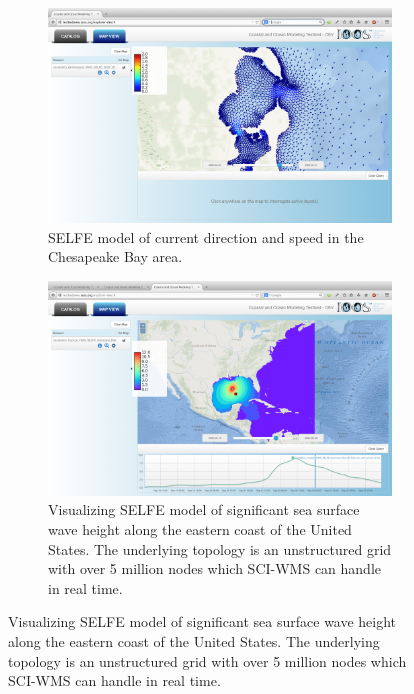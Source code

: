 \begin{figure}[ht!]
  \begin{subfigure}[t]{0.45\textwidth}
    \centering
    \includegraphics[width=\columnwidth]{../figs/vims_selfe_ubaratropic_vbaratropic_chesapeake_bay}
    \caption{SELFE model of current
      direction and speed in the Chesapeake Bay area.}
  \end{subfigure}
  \begin{subfigure}[t]{0.45\textwidth}
    \centering
    \includegraphics[width=\columnwidth]{../figs/inundation_tropical_VIMS_SELFE_hurricane_rita_2d_final_run_with_waves_sea_surface_wave_significant_height}
    \caption{Visualizing SELFE model of significant sea surface wave height along the eastern coast of the United States. The underlying topology is an unstructured grid with over 5 million nodes which SCI-WMS can handle in real time.}
  \end{subfigure}
\end{figure}


